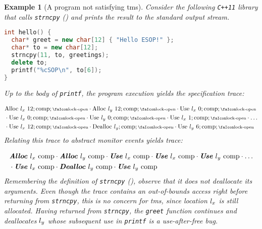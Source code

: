 \documentclass[dvipsnames]{llncs}
\newtheorem{exampleenv}{Example}[section]
\begin{document}
\begin{exampleenv}[A program not satisfying \gls*{tms}]\label{ex:strncpy:cpp11}
  Consider the following \texttt{C++11} library that calls \texttt{strncpy} () and prints the result to the standard output stream.

  \begin{lstlisting}[language=c++,basicstyle=\small\ttfamily,mathescape,commentstyle=\color{gray}]
int hello() {
  char* greet = new char[12] { "Hello ESOP!" };
  char* to = new char[12];
  strncpy(11, to, greetings);
  delete to;
  printf("%cSOP\n", to[6]);
}
  \end{lstlisting}
% 
  Up to the body of \texttt{printf}, the program execution yields the specification trace: 

  	\vspace{-1em}
  	{\small
  	\begin{align*}
  		&
  		\ev{Alloc}\ \loc[_{x}]\ 12;\comp;\unlock
  		\cdot
  		\ev{Alloc}\ \loc[_{y}]\ 12;\comp;\unlock
  		\cdot
  		\ev{Use}\ \loc_{x}\ 0;\comp;\unlock
  		\\
  		&
  		\cdot
  		\ev{Use}\ \loc_{x}\ 0;\comp;\unlock
  		\cdot
  		\ev{Use}\ \loc_{y}\ 0;\comp;\unlock
  		\cdot
  		\ev{Use}\ \loc_{x}\ 1;\comp;\unlock
  		\cdot
  		\ldots
  		\\
  		&
  		\cdot
  		\ev{Use}\ \loc_{x}\ 12;\comp;\unlock
  		\cdot
  		\ev{Dealloc}\ \loc[_{y}];\comp;\unlock
  		\cdot
  		\ev{Use}\ \loc_{y}\ 6;\comp;\unlock
  	\end{align*}
  	}
Relating this trace to abstract monitor events yields trace:
  
  \vspace{-1em}
  {\small
  \begin{align*}
   	&
   	\absev{Alloc}\ \loc[_{x}]\ \comp
   	\cdot
   	\absev{Alloc}\ \loc[_{y}]\ \comp
   	\cdot
   	\absev{Use}\ \loc[_{x}]\ \comp
   	\cdot
   	\absev{Use}\ \loc[_{x}]\ \comp
   	\cdot
   	\absev{Use}\ \loc[_{y}]\ \comp
   	\cdot
   	\ldots
   	\\
   	&
   	\cdot
   	\absev{Use}\ \loc[_{x}]\ \comp
   	\cdot
   	\absev{Dealloc}\ \loc[_{y}]\ \comp
   	\cdot
   	\absev{Use}\ \loc[_{y}]\ \comp
   \end{align*} 
  	}
  Remembering the definition of \texttt{strncpy} (), observe that it does not deallocate its arguments.
  Even though the trace contains an out-of-bounds access right before returning from \texttt{strncpy}, this is no concern for \gls*{tms}, since location $\loc[_{x}]$ is still allocated.
  Having returned from \texttt{strncpy}, the \texttt{greet} function continues and deallocates $\loc[_{y}]$ whose subsequent use in \texttt{printf} is a use-after-free bug.


\end{exampleenv}
\end{document}
